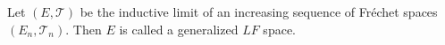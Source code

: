 Let $(E, \mathcal{T})$ be the inductive limit of an increasing sequence of Fréchet spaces $(E_n, \mathcal{T}_n)$. Then $E$ is called a generalized $LF$ space.
